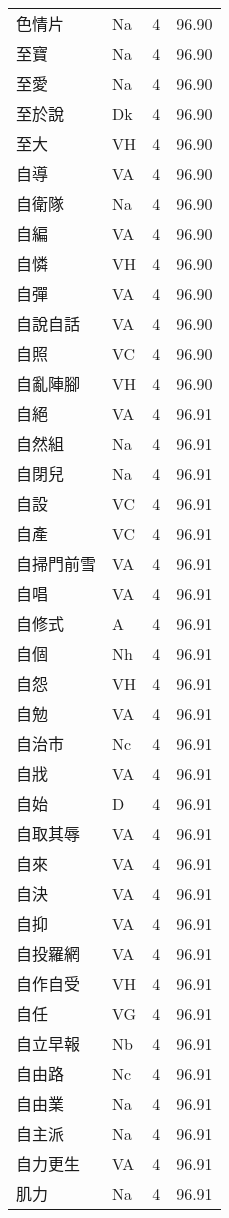 \documentclass[twocolumn]{book}
\begin{document}
\begin{supertabular}{llrr}
色情片 & Na & 4 &  96.90\\
至寶 & Na & 4 &  96.90\\
至愛 & Na & 4 &  96.90\\
至於說 & Dk & 4 &  96.90\\
至大 & VH & 4 &  96.90\\
自導 & VA & 4 &  96.90\\
自衛隊 & Na & 4 &  96.90\\
自編 & VA & 4 &  96.90\\
自憐 & VH & 4 &  96.90\\
自彈 & VA & 4 &  96.90\\
自說自話 & VA & 4 &  96.90\\
自照 & VC & 4 &  96.90\\
自亂陣腳 & VH & 4 &  96.90\\
自絕 & VA & 4 &  96.91\\
自然組 & Na & 4 &  96.91\\
自閉兒 & Na & 4 &  96.91\\
自設 & VC & 4 &  96.91\\
自產 & VC & 4 &  96.91\\
自掃門前雪 & VA & 4 &  96.91\\
自唱 & VA & 4 &  96.91\\
自修式 & A & 4 &  96.91\\
自個 & Nh & 4 &  96.91\\
自怨 & VH & 4 &  96.91\\
自勉 & VA & 4 &  96.91\\
自治市 & Nc & 4 &  96.91\\
自戕 & VA & 4 &  96.91\\
自始 & D & 4 &  96.91\\
自取其辱 & VA & 4 &  96.91\\
自來 & VA & 4 &  96.91\\
自決 & VA & 4 &  96.91\\
自抑 & VA & 4 &  96.91\\
自投羅網 & VA & 4 &  96.91\\
自作自受 & VH & 4 &  96.91\\
自任 & VG & 4 &  96.91\\
自立早報 & Nb & 4 &  96.91\\
自由路 & Nc & 4 &  96.91\\
自由業 & Na & 4 &  96.91\\
自主派 & Na & 4 &  96.91\\
自力更生 & VA & 4 &  96.91\\
肌力 & Na & 4 &  96.91\\

\end{supertabular}
\end{document}
